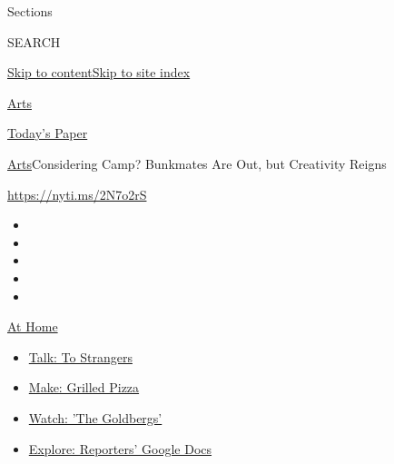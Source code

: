 Sections

SEARCH

\protect\hyperlink{site-content}{Skip to
content}\protect\hyperlink{site-index}{Skip to site index}

\href{https://www.nytimes3xbfgragh.onion/section/arts}{Arts}

\href{https://myaccount.nytimes3xbfgragh.onion/auth/login?response_type=cookie\&client_id=vi}{}

\href{https://www.nytimes3xbfgragh.onion/section/todayspaper}{Today's
Paper}

\href{/section/arts}{Arts}\textbar{}Considering Camp? Bunkmates Are Out,
but Creativity Reigns

\url{https://nyti.ms/2N7o2rS}

\begin{itemize}
\item
\item
\item
\item
\item
\end{itemize}

\href{https://www.nytimes3xbfgragh.onion/spotlight/at-home?action=click\&pgtype=Article\&state=default\&region=TOP_BANNER\&context=at_home_menu}{At
Home}

\begin{itemize}
\tightlist
\item
  \href{https://www.nytimes3xbfgragh.onion/2020/08/03/well/family/the-benefits-of-talking-to-strangers.html?action=click\&pgtype=Article\&state=default\&region=TOP_BANNER\&context=at_home_menu}{Talk:
  To Strangers}
\item
  \href{https://www.nytimes3xbfgragh.onion/2020/08/01/at-home/coronavirus-make-pizza-on-a-grill.html?action=click\&pgtype=Article\&state=default\&region=TOP_BANNER\&context=at_home_menu}{Make:
  Grilled Pizza}
\item
  \href{https://www.nytimes3xbfgragh.onion/2020/07/31/arts/television/goldbergs-abc-stream.html?action=click\&pgtype=Article\&state=default\&region=TOP_BANNER\&context=at_home_menu}{Watch:
  'The Goldbergs'}
\item
  \href{https://www.nytimes3xbfgragh.onion/interactive/2020/at-home/even-more-reporters-editors-diaries-lists-recommendations.html?action=click\&pgtype=Article\&state=default\&region=TOP_BANNER\&context=at_home_menu}{Explore:
  Reporters' Google Docs}
\end{itemize}

